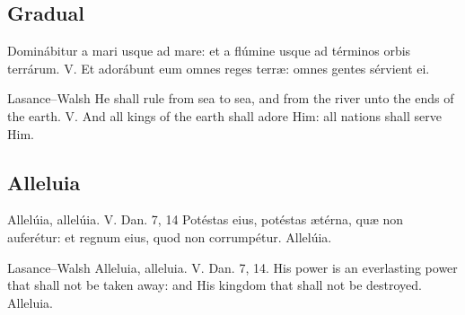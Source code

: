 \subsection{Gradual}
\label{proper-gradual}
\begin{latinproper}
Dominábitur a mari usque ad mare: et a flúmine usque ad términos orbis terrárum. \textnormal{V.} Et adorábunt eum omnes reges terræ: omnes gentes sérvient ei.
\end{latinproper}
\begin{englishwitness}{Lasance--Walsh}
He shall rule from sea to sea, and from the river unto the ends of the earth. \textnormal{V.} And all kings of the earth shall adore Him: all nations shall serve Him.
\end{englishwitness}
\subsection{Alleluia}
\label{proper-alleluia}
\begin{latinproper}
Allelúia, allelúia. \textnormal{V.} \textnormal{Dan. 7, 14} Potéstas eius, potéstas ætérna, quæ non auferétur: et regnum eius, quod non corrumpétur. Allelúia.
\end{latinproper}
\begin{englishwitness}{Lasance--Walsh}
Alleluia, alleluia. \textnormal{V.} \textnormal{Dan. 7, 14.} His power is an everlasting power that shall not be taken away: and His kingdom that shall not be destroyed. Alleluia.
\end{englishwitness}
